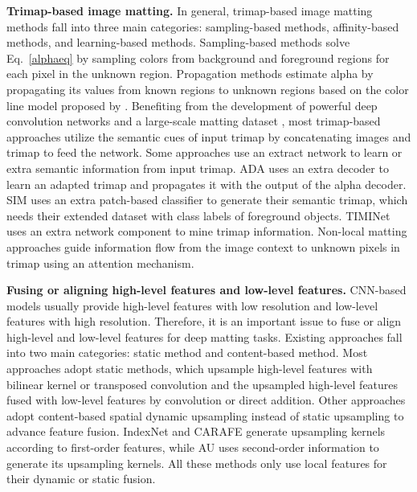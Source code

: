 \documentclass[10pt,twocolumn,letterpaper]{article}
\begin{document}
\textbf{Trimap-based image matting.} In general, trimap-based image matting methods fall into three main categories: sampling-based methods, affinity-based methods, and learning-based methods. Sampling-based methods \cite{bayes_12,cluster_14,global_18,alpha_36} solve Eq.~\ref{alphaeq} by sampling colors from background and foreground regions for each pixel in the unknown region. Propagation methods \cite{knn_10,random_17,closed_24,spectral_25} estimate alpha by propagating its values from known regions to unknown regions based on the color line model proposed by \cite{closed_24}. Benefiting from the development of powerful deep convolution networks and a large-scale matting dataset \cite{deepmatting}, most trimap-based approaches \cite{deepmatting,indexnet,context,fba,pii,lfpnet} utilize the semantic cues of input trimap by concatenating images and trimap to feed the network. Some approaches use an extract network to learn or extra semantic information from input trimap. ADA \cite{adamatting} uses an extra decoder to learn an adapted trimap and propagates it with the output of the alpha decoder. SIM \cite{sim} uses an extra patch-based classifier to generate their semantic trimap, which needs their extended dataset with class labels of foreground objects. TIMINet \cite{timinet} uses an extra network component to mine trimap information. Non-local matting approaches \cite{gca,hdmatt}  guide information flow from the image context to unknown pixels in trimap using an attention mechanism.

\textbf{Fusing or aligning high-level features and low-level features.} CNN-based models usually provide high-level features with low resolution and low-level features with high resolution. Therefore, it is an important issue to fuse or align high-level and low-level features for deep matting tasks. Existing approaches fall into two main categories: static method and content-based method. Most approaches \cite{deepmatting,fba,gca,lfpnet} adopt static methods, which upsample high-level features with bilinear kernel or transposed convolution and the upsampled high-level features fused with low-level features by convolution or direct addition. Other approaches \cite{indexnet,carafe,a2u} adopt content-based spatial dynamic upsampling  instead of static upsampling to advance feature fusion. IndexNet \cite{indexnet} and CARAFE \cite{carafe} generate upsampling kernels according to  first-order features, while AU \cite{a2u} uses second-order information to generate its upsampling kernels. All these methods only use local features for their dynamic or static fusion.
\end{document}
